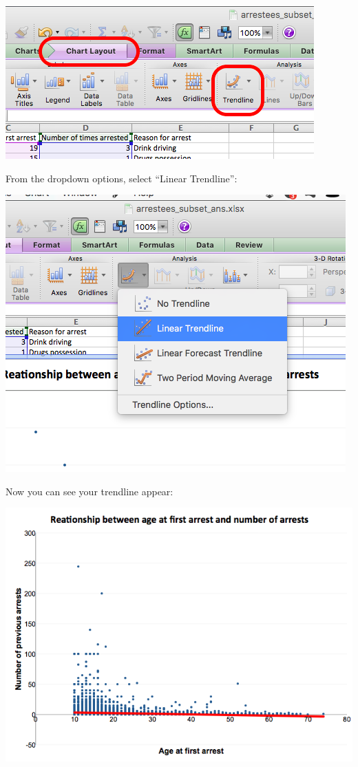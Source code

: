 \documentclass[
]{book}
\begin{document}
\includegraphics{imgs/scatter_10.png}

From the dropdown options, select ``Linear Trendline'':

\includegraphics{imgs/scatter_11.png}

Now you can see your trendline appear:

\includegraphics{imgs/scatter_12.png}
\end{document}
